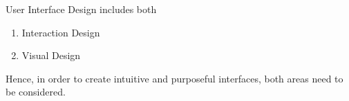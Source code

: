 \documentclass[a4paper, justified, notoc]{tufte-handout} %
\begin{document}
%
%


User Interface Design includes both
\begin{enumerate}
	\item Interaction Design
	\item Visual Design
\end{enumerate}

Hence, in order to create intuitive and purposeful interfaces, both areas need to be considered.







\newpage

\end{document}
